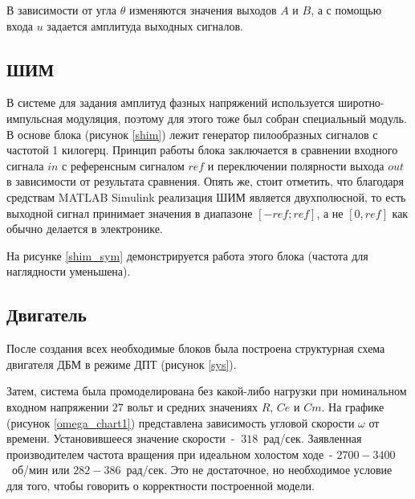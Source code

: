 
В зависимости от угла $\theta$ изменяются значения выходов $A$ и $B$, а с помощью входа $u$ задается амплитуда
выходных сигналов.

\subsection{ШИМ}


В системе для задания амплитуд фазных напряжений используется широтно-импульсная модуляция, 
поэтому для этого тоже был собран специальный модуль.
В основе блока (рисунок \ref{shim}) лежит генератор пилообразных сигналов с частотой 1 килогерц. 
Принцип работы блока заключается в сравнении входного сигнала $in$ с референсным сигналом
$ref$ и переключении полярности выхода $out$ в зависимости от результата сравнения. Опять же, стоит отметить, что
благодаря средствам MATLAB Simulink реализация ШИМ является двухполюсной, то есть выходной сигнал принимает
значения в диапазоне $[-ref; ref]$, а не $[0, ref]$ как обычно делается в электронике.

На рисунке \ref{shim_sym} демонстрируется работа этого блока (частота для наглядности уменьшена).


\subsection{Двигатель}

После создания всех необходимые блоков была построена структурная схема двигателя ДБМ в режиме ДПТ (рисунок \ref{sys}).


Затем, система была промоделирована без какой-либо нагрузки при номинальном входном 
напряжении $27$ вольт и средних значениях $R$, $Ce$ и $Cm$. На графике (рисунок \ref{omega_chart1}) 
представлена зависимость угловой скорости $\omega$ от времени. Установившееся значение скорости~- $~318$~рад/сек. Заявленная
производителем частота вращения при идеальном холостом ходе~- $2700-3400$~об/мин или $282-386$~рад/сек. Это 
не достаточное, но необходимое условие для того, чтобы говорить о корректности построенной модели.


